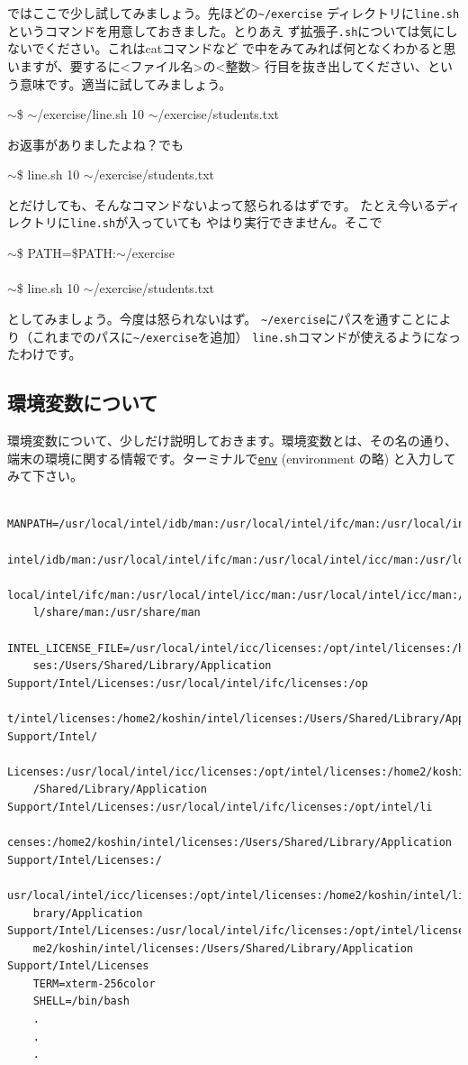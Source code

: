 \documentclass[a4j]{ltjsreport}
\begin{document}
    ではここで少し試してみましょう。先ほどの\verb+~/exercise+
    ディレクトリに\verb+line.sh+というコマンドを用意しておきました。とりあえ
    ず拡張子\verb+.sh+については気にしないでください。これはcatコマンドなど
    で中をみてみれば何となくわかると思いますが、要するに<ファイル名>の<整数>
    行目を抜き出してください、という意味です。適当に試してみましょう。
    \begin{screen}
        $\sim$\$ $\sim$/exercise/line.sh 10  $\sim$/exercise/students.txt
    \end{screen}
    お返事がありましたよね？でも
    \begin{screen}
        $\sim$\$ line.sh 10  $\sim$/exercise/students.txt
    \end{screen}
    とだけしても、そんなコマンドないよって怒られるはずです。
    たとえ今いるディレクトリに\verb+line.sh+が入っていても
    やはり実行できません。そこで
    \begin{screen}
        $\sim$\$ PATH=\$PATH:$\sim$/exercise\\
        \\
        $\sim$\$ line.sh 10  $\sim$/exercise/students.txt
    \end{screen}
    としてみましょう。今度は怒られないはず。
    \verb+~/exercise+にパスを通すことにより（これまでのパスに\verb+~/exercise+を追加）
    \verb+line.sh+コマンドが使えるようになったわけです。
    \subsection{環境変数について}
    環境変数について、少しだけ説明しておきます。環境変数とは、その名の通り、
    端末の環境に関する情報です。ターミナルで\underline{\texttt{env}} (environment の略) 
    と入力してみて下さい。
    \begin{verbatim}
    MANPATH=/usr/local/intel/idb/man:/usr/local/intel/ifc/man:/usr/local/intel/icc/man:/usr/local/
    intel/idb/man:/usr/local/intel/ifc/man:/usr/local/intel/icc/man:/usr/local/intel/idb/man:/usr/
    local/intel/ifc/man:/usr/local/intel/icc/man:/usr/local/intel/icc/man:/usr/local/man:/usr/loca
    l/share/man:/usr/share/man
    INTEL_LICENSE_FILE=/usr/local/intel/icc/licenses:/opt/intel/licenses:/home2/koshin/intel/licen
    ses:/Users/Shared/Library/Application Support/Intel/Licenses:/usr/local/intel/ifc/licenses:/op
    t/intel/licenses:/home2/koshin/intel/licenses:/Users/Shared/Library/Application Support/Intel/
    Licenses:/usr/local/intel/icc/licenses:/opt/intel/licenses:/home2/koshin/intel/licenses:/Users
    /Shared/Library/Application Support/Intel/Licenses:/usr/local/intel/ifc/licenses:/opt/intel/li
    censes:/home2/koshin/intel/licenses:/Users/Shared/Library/Application Support/Intel/Licenses:/
    usr/local/intel/icc/licenses:/opt/intel/licenses:/home2/koshin/intel/licenses:/Users/Shared/Li
    brary/Application Support/Intel/Licenses:/usr/local/intel/ifc/licenses:/opt/intel/licenses:/ho
    me2/koshin/intel/licenses:/Users/Shared/Library/Application Support/Intel/Licenses
    TERM=xterm-256color
    SHELL=/bin/bash
    .                                                
    .
    .
    \end{verbatim}
\end{document}
